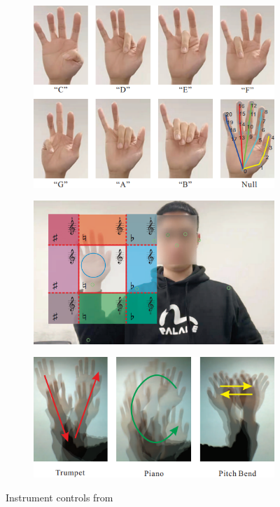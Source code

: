 \begin{figure}[ht]
	\centering
	\begin{subfigure}{0.32\textwidth}
		\centering
		\includegraphics[width=\textwidth]{images/related-work/pitch-control}
	\end{subfigure}
	\hfill
	\begin{subfigure}{0.32\textwidth}
		\centering
		\includegraphics[width=\textwidth]{images/related-work/octave-control}
	\end{subfigure}
	\hfill
	\begin{subfigure}{0.32\textwidth}
		\centering
		\includegraphics[width=\textwidth]{images/related-work/instrument-control}
	\end{subfigure}
	\caption{Instrument controls from~\protect\cite{hand-gesture-controlled-music-instrument}}
	\label{fig:instrument-control}
\end{figure}

